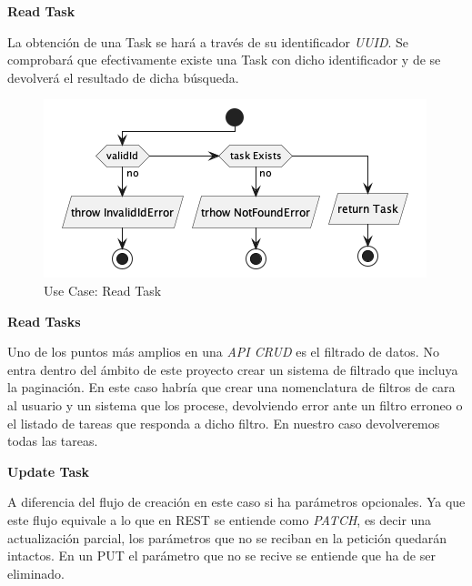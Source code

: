 \textbf{Read Task}

La obtención de una Task se hará a través de su identificador \textit{UUID}. Se comprobará que efectivamente existe una Task con dicho identificador y de se devolverá el resultado de dicha búsqueda.

\begin{figure}[H]
    \centering
    \includegraphics[height=0.15\textheight]{./part/Proyecto_ejecutivo/memoria_descriptiva/descripcionDelProyecto/manager/uml/getTaskUseCase}
    \caption{Use Case: Read Task}\label{fig:Use Case-Read Task}
\end{figure}

\textbf{Read Tasks}

Uno de los puntos más amplios en una \textit{API CRUD} es el filtrado de datos. No entra dentro del ámbito de este proyecto crear un sistema de filtrado que incluya la paginación. En este caso habría que crear una nomenclatura de filtros de cara al usuario y un sistema que los procese, devolviendo error ante un filtro erroneo o el listado de tareas que responda a dicho filtro. En nuestro caso devolveremos todas las tareas.

\textbf{Update Task}

A diferencia del flujo de creación en este caso si ha parámetros opcionales. Ya que este flujo equivale a lo que en \gls{REST} se entiende como \textit{PATCH}, es decir una actualización parcial, los parámetros que no se reciban en la petición quedarán intactos. En un PUT el parámetro que no se recive se entiende que ha de ser eliminado.


